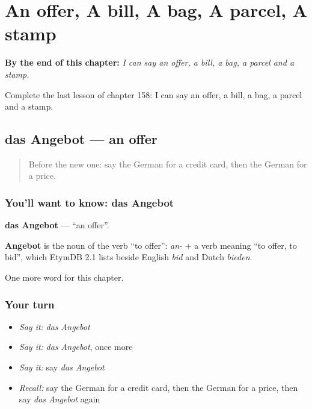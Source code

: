 
\chapter{An offer, A bill, A bag, A parcel, A stamp}
\label{ch:ge-an-offer-a-bill-a-bag-a-parcel-a-stamp}

\begin{chapteropening}
\textbf{By the end of this chapter:} \emph{I can say an offer, a bill, a bag, a parcel and a stamp.}

Complete the last lesson of chapter 158: I can say an offer, a bill, a bag, a parcel and a stamp.
\end{chapteropening}

\section[das Angebot]{das Angebot — an offer}

\label{lesson:GE-C158-angebot}



\begin{quote}
Before the new one: say the German for a credit card, then the German for a price.
\end{quote}

\subsection*{You'll want to know: das Angebot}
\textbf{das Angebot} — \textquotedblleft{}an offer\textquotedblright{}.

\begin{cousinweb}
\textbf{Angebot} is the noun of the verb \textquotedblleft{}to offer\textquotedblright{}: \emph{an-} + a verb meaning \textquotedblleft{}to offer, to bid\textquotedblright{}, which EtymDB 2.1 lists beside English \emph{bid} and Dutch \emph{bieden}.
\end{cousinweb}

\begin{grammarlens}[title={What you've built}]
One more word for this chapter.
\end{grammarlens}

\subsection*{Your turn}
\begin{itemize}
\raggedright
  \item \emph{Say it:} \emph{das Angebot}
  \item \emph{Say it:} \emph{das Angebot}, once more
  \item \emph{Say it:} say \emph{das Angebot}
  \item \emph{Recall:} say the German for a credit card, then the German for a price, then say \emph{das Angebot} again
\end{itemize}

